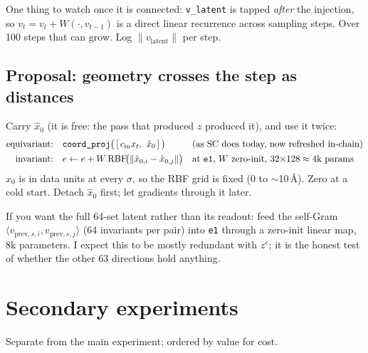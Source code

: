 \documentclass[11pt,a4paper]{article}
\newcommand{\ze}{z^{e}}
\newcommand{\xh}{\hat{x}_0}
\newcommand{\xhat}[1]{\hat{x}_{0,#1}}
\newcommand{\code}[1]{\texttt{#1}}
\begin{document}
One thing to watch once it is connected: \code{v\_latent} is tapped \emph{after} the
injection, so $v_t = v_t + W(\cdot,v_{t-1})$ is a direct linear recurrence across
sampling steps. Over 100 steps that can grow. Log $\|v_{\text{latent}}\|$ per step.

\subsection{Proposal: geometry crosses the step as distances}\label{sec:vdist}

Carry $\xh$ (it is free: the pass that produced $z$ produced it), and use it twice:
\begin{align*}
  \text{equivariant:}\quad & \code{coord\_proj}\big(\,[\,c_{\text{in}}x_t,\ \xh\,]\,\big) && \text{(as SC does today, now refreshed in-chain)}\\
  \text{invariant:}\quad & e \leftarrow e + W\,\mathrm{RBF}\!\big(\|\xhat{i}-\xhat{j}\|\big) && \text{at \code{e1}, } W \text{ zero-init, } 32{\times}128 \approx 4\text{k params}
\end{align*}
$\xh$ is in data units at every $\sigma$, so the RBF grid is fixed (0 to $\sim$10\,\AA).
Zero at a cold start. Detach $\xh$ first; let gradients through it later.

If you want the full 64-set latent rather than its readout: feed the self-Gram
$\langle v_{\text{prev},s,i}, v_{\text{prev},s,j}\rangle$ (64 invariants per pair) into
\code{e1} through a zero-init linear map, 8k parameters. I expect this to be mostly
redundant with $\ze$; it is the honest test of whether the other 63 directions hold
anything.

\section{Secondary experiments}\label{sec:secondary}

Separate from the main experiment; ordered by value for cost.
\end{document}
